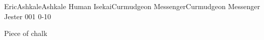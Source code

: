 
\filledCS%
  {\ifnum{}\ifnum{} Eric\else Ashkale\fi\else Ashkale\fi}%
  {Human}%
  {\ifnum{}\ifnum{} Isekai\else Curmudgeon Messenger\fi\else Curmudgeon Messenger\fi}%
  {Jester}%
  {{0}{0}{1}}%
  {{0}{-1}{0}}%
  {%
    \setcounter{Athletics}{2}
    \setcounter{Stealth}{1}
    \setcounter{Cultivation}{1}

    \setcounter{Melee}{1}
    \addtocounter{equipmentWeight}{-1}
  }%
  {\charge}%
  {Piece of chalk}%

